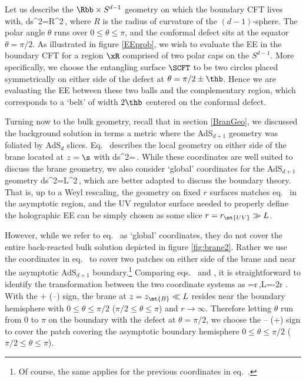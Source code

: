 Let us describe the $\Rbb\times S^{d-1}$ geometry on which the boundary CFT lives with,
\beq\label{metricCFT}
ds^2=R^2\,,
\eeq
where $R$ is the radius of curvature of the $(d-1)$-sphere. The polar angle $\theta$ runs over $0\le\theta\le\pi$, and the conformal defect sits at the equator $\theta=\pi/2$. As illustrated in figure \ref{EEprob}, we wish to evaluate the EE in the boundary CFT for a region $\xR$ comprised of two polar caps on the $S^{d-1}$. More specifically, we choose the entangling surface $\SCFT$ to be two circles placed  symmetrically on either side of the defect at $\theta=\pi/2\pm\thb$. Hence we are evaluating the EE between these two balls and the complementary region, which corresponds to a `belt' of width $2\thb$ centered on the conformal defect.

Turning now to the bulk geometry, recall that in section \ref{BranGeo}, we discussed the background solution in terms a metric where the AdS$_{d+1}$ geometry was foliated by AdS$_d$ slices. Eq.~ describes the local geometry on either side of the brane
located at $z=\s$ with
\beq\label{metric3a}
ds^2=\,.
\eeq
While these coordinates are well suited to discuss the brane geometry, we also consider `global' coordinates for the AdS$_{d+1}$ geometry
\beq\label{metric2s}
ds^2=L^2\,,
\eeq
which are better adapted to discuss the boundary theory. That is, up to a Weyl rescaling, the geometry on fixed $r$ surfaces matches eq.~  in the asymptotic region, and the UV regulator surface needed to properly define the holographic EE can be simply chosen as some slice $r=r_\mt{UV}\gg L$.

However, while we refer to eq.~ as `global' coordinates, they do not cover the entire back-reacted bulk solution depicted in figure \ref{fig:brane2}. Rather we use the coordinates in eq.~ to cover two patches on either side of the brane and near the asymptotic AdS$_{d+1}$ boundary.\footnote{Of course, the same applies for the previous coordinates in eq.~.} Comparing eqs.~ and , it is straightforward to identify the transformation between the two coordinate systems as
\beq\label{transfor1}
\tanh\tdr=\tanh r\sin\theta\,,\quad {}L=-2\sinh r\,\cos\theta{}\,.
\eeq
With the + (--) sign, the brane at $z=z_\mt{B}\ll L$ resides near the boundary hemisphere with $0\le\theta\le\pi/2$ ($\pi/2\le\theta\le\pi$) and $r\to\infty$. Therefore letting $\theta$ run from 0 to $\pi$ on the boundary with the defect at $\theta=\pi/2$, we choose the -- (+) sign to cover the patch covering the asymptotic boundary hemisphere $0\le\theta\le\pi/2$ ($\pi/2\le\theta\le\pi$).

